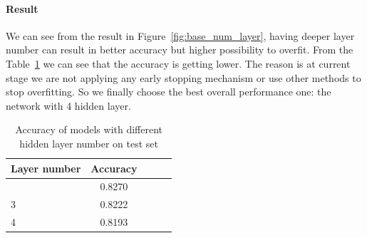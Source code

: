 \documentclass{article}
\begin{document}
\paragraph{Result}
We can see from the result in Figure~\ref{fig:base_num_layer}, having deeper layer number can result in better accuracy but higher possibility to overfit. From the Table~\ref{tab:layer_num} we can see that the accuracy is getting lower. The reason is at current stage we are not applying any early stopping mechanism or use other methods to stop overfitting. So we finally choose the best overall performance one: the network with 4 hidden layer.
 

\begin{table}[tb]
\vskip 3mm
\begin{center}
\begin{small}
\begin{sc}
\begin{tabular}{lcccr}
\hline
\abovespace\belowspace
Layer number & Accuracy \\
\hline
\abovespace
2    	& 0.8270 	\\
3	 	& 0.8222 	\\
4	  	& 0.8193 	\\

\hline
\end{tabular}
\end{sc}
\end{small}
\caption{Accuracy of models with different hidden layer number on test set}
\label{tab:layer_num}
\end{center}
\vskip -3mm
\end{table}
\end{document}
